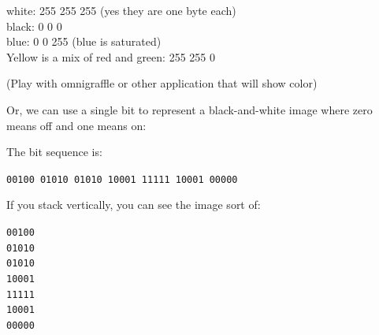 \documentclass[titlepage]{tufte-book}
\begin{document}
\begin{fullwidth}
white: 255 255 255  (yes they are one byte each) \\
black: 0 0 0\\
blue: 0 0 255 (blue is saturated)\\
Yellow is a mix of red and green: 255 255 0

(Play with omnigraffle or other application that will show color)

\noindent Or, we can use a single bit to represent a black-and-white image where zero means off and one means on:


\noindent The bit sequence is:

{\tt 00100 01010 01010 10001 11111 10001 00000}

\noindent If you stack vertically, you can see the image sort of:

{\tt 00100\\
     01010 \\
     01010 \\
     10001 \\
     11111 \\
     10001 \\
     00000}


\end{fullwidth}
\end{document}
